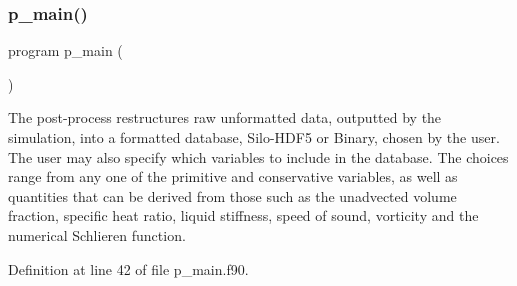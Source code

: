 \subsubsection{\texorpdfstring{p\+\_\+main()}{p\_main()}}
{\footnotesize\ttfamily program p\+\_\+main (\begin{DoxyParamCaption}{ }\end{DoxyParamCaption})}



The post-\/process restructures raw unformatted data, outputted by the simulation, into a formatted database, Silo-\/\+H\+D\+F5 or Binary, chosen by the user. The user may also specify which variables to include in the database. The choices range from any one of the primitive and conservative variables, as well as quantities that can be derived from those such as the unadvected volume fraction, specific heat ratio, liquid stiffness, speed of sound, vorticity and the numerical Schlieren function. 



Definition at line 42 of file p\+\_\+main.\+f90.

